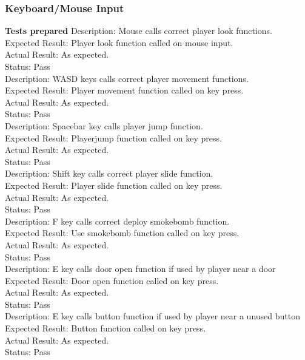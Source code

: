 \documentclass[11pt,a4paper]{article}
\begin{document}
\subsubsection{Keyboard/Mouse Input}
\textbf{Tests prepared}
Description: Mouse calls correct player look functions.\\
Expected Result: Player look function called on mouse input.\\
Actual Result: As expected.\\
Status: Pass
\smallskip\\
Description: WASD keys calls correct player movement functions.\\
Expected Result: Player movement function called on key press.\\
Actual Result: As expected.\\
Status: Pass
\smallskip\\
Description: Spacebar key calls player jump function.\\
Expected Result: Playerjump function called on key press.\\
Actual Result: As expected.\\
Status: Pass
\smallskip\\
Description: Shift key calls correct player slide function.\\
Expected Result: Player slide function called on key press.\\
Actual Result: As expected.\\
Status: Pass
\smallskip\\
Description: F key calls correct deploy smokebomb function.\\
Expected Result: Use smokebomb function called on key press.\\
Actual Result: As expected.\\
Status: Pass
\smallskip\\
Description: E key calls door open function if used by player near a door\\
Expected Result: Door open function called on key press.\\
Actual Result: As expected.\\
Status: Pass
\smallskip\\
Description: E key calls button function if used by player near a unused button\\
Expected Result: Button function called on key press.\\
Actual Result: As expected.\\
Status: Pass
\end{document}
